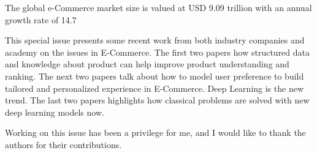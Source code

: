 \documentclass[11pt]{article}
\begin{document}
The global e-Commerce market size is valued at USD 9.09 trillion with an annual growth rate of 14.7%

%
This special issue presents some recent work from both industry companies and academy on the issues in E-Commerce. The first two papers how structured data and knowledge about product can help improve product understanding and ranking. The next two papers talk about how to model user preference to build tailored and personalized experience in E-Commerce. Deep Learning is the new trend. The last two papers highlights how classical problems are solved with new deep learning models now. 


Working on this issue has been a privilege for me, and I would like to thank the authors for their  contributions.
\end{document}
